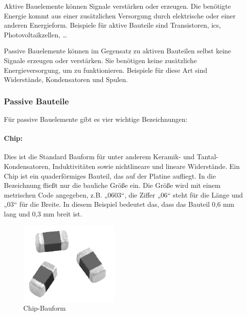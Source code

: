 Aktive Bauelemente können Signale verstärken oder erzeugen. Die benötigte Energie kommt aus einer zusätzlichen Versorgung durch elektrische oder einer anderen Energieform. Beispiele für aktive Bauteile sind Transistoren, \acp{ic}, Photovoltaikzellen, \dots\par

Passive Bauelemente können im Gegensatz zu aktiven Bauteilen selbst keine Signale erzeugen oder verstärken. Sie benötigen keine zusätzliche Energieversorgung, um zu funktionieren. Beispiele für diese Art sind Widerstände, Kondensatoren und Spulen.

\subsubsection{Passive Bauteile}
Für passive Bauelemente gibt es vier wichtige Bezeichnungen:
\paragraph{Chip:}
Dies ist die Standard Bauform für unter anderem Keramik- und Tantal-Konden\-satoren, Induktivitäten sowie nichtlineare und lineare Widerstände.
Ein Chip ist ein quaderförmiges Bauteil, das auf der Platine aufliegt. In die Bezeichnung fließt nur die bauliche Größe ein.
Die Größe wird mit einem metrischen Code angegeben, z.B. „0603“, die Ziffer „06“ steht für die Länge und „03“ für die Breite.
In diesem Beispiel bedeutet das, dass das Bauteil 0,6 mm lang und 0,3 mm breit ist.
\begin{figure}[htbp!]
	\centering
	\includegraphics{images/technische_grundlagen/chip.png}
	\caption{Chip-Bauform \cite[vgl.][]{vishay-chip}}
\end{figure}

